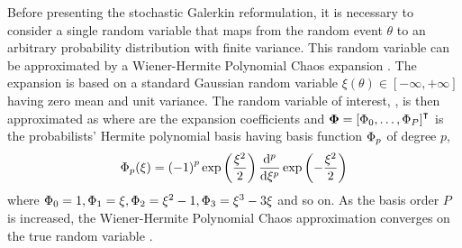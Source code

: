 Before presenting the stochastic Galerkin reformulation, it is necessary to consider a single random variable  that maps from the random event $\theta$ to an arbitrary probability distribution with finite variance.
This random variable can be approximated by a Wiener-Hermite Polynomial Chaos expansion \citep{xiu-karniadakis2002}.
The expansion is based on a standard Gaussian random variable $\xi(\theta) \in [-\infty, +\infty]$ having zero mean and unit variance.
The random variable of interest, , is then approximated as
where  are the expansion coefficients and $\bm{\Phi} = \left[ \Phi_0, \ldots, \Phi_P \right]^\intercal$ is the probabilists' Hermite polynomial basis having basis function $\Phi_p$ of degree $p$,
\begin{align}
    \Phi_p(\xi) = \left( -1 \right)^p \exp \left(\frac{\xi^2}{2}\right)
    \frac{\mathrm{d}^p}{\mathrm{d} \xi^p} \exp \left(- \frac{\xi^2}{2} \right)
\end{align}
where $\Phi_0 = 1, \Phi_1 = \xi, \Phi_2 = \xi^2 - 1, \Phi_3 = \xi^3 - 3\xi$ and so on.
As the basis order $P$ is increased, the Wiener-Hermite Polynomial Chaos approximation converges on the true random variable  \citep{xiu-karniadakis2002}.

